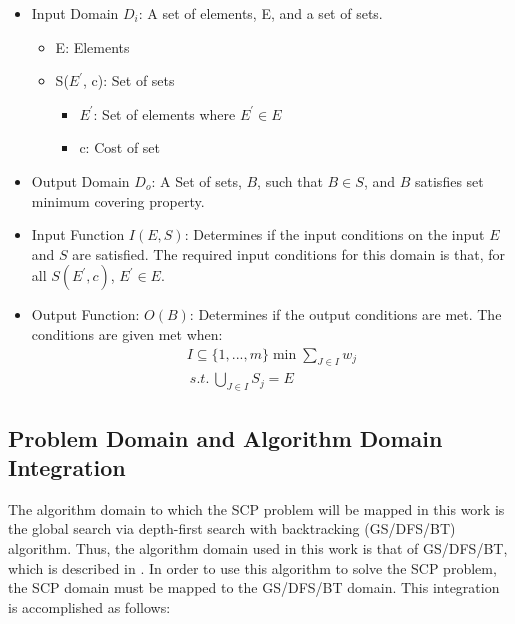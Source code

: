 \documentclass[12pt]{article}
\begin{document}
\begin{itemize}
	\item Input Domain $D_i$: A set of elements, E, and a set of sets. 
	\begin{itemize}
		\item E: Elements
		\item S($E^\prime$, c): Set of sets
			\begin{itemize}
				\item $E^\prime$: Set of elements where $E^\prime \in E$
				\item c: Cost of set
			\end{itemize}
	\end{itemize}	
	\item Output Domain $D_o$: A Set of sets, $B$, such that $B \in S$, and $B$ satisfies set minimum covering property. 

	\item Input Function $I(E, S)$: Determines if the input conditions on the input $E$ and $S$ are satisfied. The required input conditions for this domain is that, for all $S(E^\prime, c)$, $E^\prime \in E$.
	\item Output Function: $O(B)$: Determines if the output conditions are met. The conditions are given met when:
	\begin{align*}
	I \subseteq \{1,...,m\} \min \sum_{J \in I} w_j \\
	\:s.t.\: \bigcup_{J \in I} S_j = E
	\end{align*}

\end{itemize}

\subsection{Problem Domain and Algorithm Domain Integration}

The algorithm domain to which the SCP problem will be mapped in this work is the global search via depth-first search with backtracking (GS/DFS/BT) algorithm. Thus, the algorithm domain used in this work is that of GS/DFS/BT, which is described in \cite{ClassNotes686}. In order to use this algorithm to solve the SCP problem, the SCP domain must be mapped to the GS/DFS/BT domain. This integration is accomplished as follows:
\end{document}
